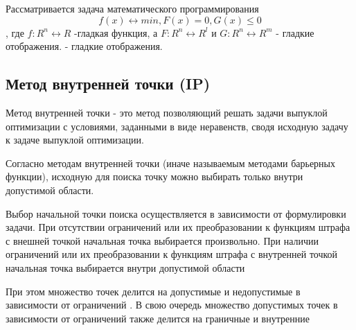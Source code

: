 \documentclass[12pt,a4paper]{article}
\begin{document}
	Рассматривается задача математического программирования
	\begin{equation}\label{eq:0}
		f(x) \longleftrightarrow min, F(x) = 0, G(x) \leq 0
	\end{equation}
, где $f:R^n \longleftrightarrow R$ -гладкая функция, а $F:R^n \longleftrightarrow R^l$ и $G:R^n \longleftrightarrow R^m$ - гладкие отображения.
	- гладкие отображения.
	\subsection{Метод внутренней точки (IP)}
	Метод внутренней точки - это метод позволяющий решать задачи выпуклой оптимизации с условиями, заданными в виде неравенств, сводя исходную задачу к задаче выпуклой оптимизации.
	
	Согласно методам внутренней точки (иначе называемым методами барьерных функции), исходную для поиска точку можно выбирать только внутри допустимой области.
	
	Выбор начальной точки поиска осуществляется в зависимости от формулировки задачи. При отсутствии ограничений или их преобразовании к функциям штрафа с внешней точкой начальная точка выбирается произвольно. При наличии ограничений или их преобразовании к функциям штрафа с внутренней точкой начальная точка выбирается внутри допустимой области
	
	При этом множество точек делится на допустимые и недопустимые в зависимости от ограничений . В свою очередь множество допустимых точек в зависимости от ограничений также делится на граничные и внутренние
	
\end{document}
